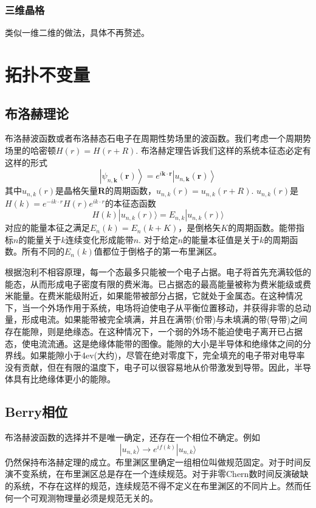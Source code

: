 \documentclass{article}
\numberwithin{equation}{subsection}
\begin{document}
\subsubsection{三维晶格}
类似一维二维的做法，具体不再赘述。
\section{拓扑不变量}
\subsection{布洛赫理论}
布洛赫波函数或者布洛赫态石电子在周期性势场里的波函数。我们考虑一个周期势场里的哈密顿$H(r)=H(r+R)$. 布洛赫定理告诉我们这样的系统本征态必定有这样的形式
\begin{equation}
    \left|\psi_{n, \mathbf{k}}(\mathbf{r})\right\rangle=e^{i \mathbf{k} \cdot \mathbf{r}}\left|u_{n, \mathbf{k}}(\mathbf{r})\right\rangle
\end{equation}
其中$u_{n,k}(r)$是晶格矢量$\mathbf{R}$的周期函数，$u_{n,k}(r)=u_{n,k}(r+R)$. $u_{n,k}(r)$是$H(k)=e^{-ik\cdot r}H(r)e^{ik\cdot r}$的本征态函数
\begin{equation}
    H(k)|u_{n,k}(r)\rangle=E_{n,k}|u_{n,k}(r)\rangle
\end{equation}
对应的能量本征之满足$E_{n}(k)=E_{n}(k+K)$，是倒格矢$K$的周期函数。能带指标$n$的能量关于$k$连续变化形成能带$n$. 对于给定$n$的能量本征值是关于$k$的周期函数。所有不同的$E_n(k)$值都位于倒格子的第一布里渊区。

根据泡利不相容原理，每一个态最多只能被一个电子占据。电子将首先充满较低的能态，从而形成电子密度有限的费米海。已占据态的最高能量被称为费米能级或费米能量。在费米能级附近，如果能带被部分占据，它就处于金属态。在这种情况下，当一个外场作用于系统，电场将迫使电子从平衡位置移动，并获得非零的总动量，形成电流。如果能带被完全填满，并且在满带(价带)与未填满的带(导带)之间存在能隙，则是绝缘态。在这种情况下，一个弱的外场不能迫使电子离开已占据态，使电流流通。这是绝缘体能带的图像。能隙的大小是半导体和绝缘体之间的分界线。如果能隙小于4ev(大约)，尽管在绝对零度下，完全填充的电子带对电导率没有贡献，但在有限的温度下，电子可以很容易地从价带激发到导带。因此，半导体具有比绝缘体更小的能隙。
\subsection{Berry相位}
布洛赫波函数的选择并不是唯一确定，还存在一个相位不确定。例如
\begin{equation}
    |u_{n,k}\rangle\rightarrow e^{if(k)}|u_{n,k}\rangle
\end{equation}
仍然保持布洛赫定理的成立。布里渊区里确定一组相位叫做规范固定。对于时间反演不变系统，在布里渊区总是存在一个连续规范。对于非零Chern数时间反演破缺的系统，不存在这样的规范，连续规范不得不定义在布里渊区的不同片上。然而任何一个可观测物理量必须是规范无关的。
\end{document}
